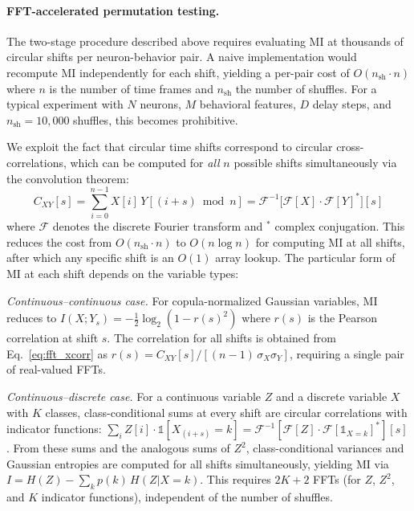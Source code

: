 \paragraph{FFT-accelerated permutation testing.}

The two-stage procedure described above requires evaluating MI at thousands of
circular shifts per neuron-behavior pair. A naive implementation would recompute
MI independently for each shift, yielding a per-pair cost of $O(n_{\text{sh}}
\cdot n)$ where $n$ is the number of time frames and $n_{\text{sh}}$ the number
of shuffles. For a typical experiment with $N$ neurons, $M$ behavioral features,
$D$ delay steps, and $n_{\text{sh}} = 10{,}000$ shuffles, this becomes
prohibitive.

We exploit the fact that circular time shifts correspond to circular
cross-correlations, which can be computed for \emph{all} $n$ possible shifts
simultaneously via the convolution theorem:
%
\begin{equation}
\label{eq:fft_xcorr}
C_{XY}[s] = \sum_{i=0}^{n-1} X[i] \, Y[(i+s) \bmod n]
           = \mathcal{F}^{-1}\!\bigl[\mathcal{F}[X] \cdot \mathcal{F}[Y]^{*}\bigr][s]
\end{equation}
%
where $\mathcal{F}$ denotes the discrete Fourier transform and $^{*}$ complex
conjugation. This reduces the cost from $O(n_{\text{sh}} \cdot n)$ to
$O(n \log n)$ for computing MI at all shifts, after which any specific shift is
an $O(1)$ array lookup. The particular form of MI at each shift depends on the
variable types:

\textit{Continuous--continuous case.}
For copula-normalized Gaussian variables, MI reduces to
$I(X; Y_s) = -\tfrac{1}{2}\log_2(1 - r(s)^2)$ where $r(s)$ is the Pearson
correlation at shift $s$. The correlation for all shifts is obtained from
Eq.~\ref{eq:fft_xcorr} as $r(s) = C_{XY}[s] / [(n-1)\,\sigma_X \sigma_Y]$,
requiring a single pair of real-valued FFTs.

\textit{Continuous--discrete case.}
For a continuous variable $Z$ and a discrete variable $X$ with $K$ classes,
class-conditional sums at every shift are circular correlations with indicator
functions:
$\sum_i Z[i] \cdot \mathbb{1}[X_{(i+s)} = k] = \mathcal{F}^{-1}[\mathcal{F}[Z]
\cdot \mathcal{F}[\mathbb{1}_{X=k}]^{*}][s]$.
From these sums and the analogous sums of $Z^2$, class-conditional variances and
Gaussian entropies are computed for all shifts simultaneously, yielding MI via
$I = H(Z) - \sum_k p(k)\,H(Z | X\!=\!k)$. This requires $2K+2$ FFTs
(for $Z$, $Z^2$, and $K$ indicator functions), independent of the number of
shuffles.

